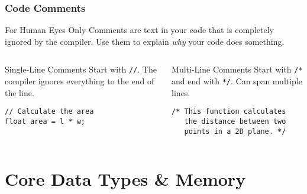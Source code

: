 \documentclass{beamer}
\begin{document}
\begin{frame}[fragile]
\frametitle{Code Comments}
\begin{block}{For Human Eyes Only}
Comments are text in your code that is completely ignored by the compiler. Use them to explain \textit{why} your code does something.
\end{block}
\pause

\begin{columns}[T]
\begin{column}{0.5\textwidth}
\begin{alertblock}{Single-Line Comments}
Start with \texttt{//}. The compiler ignores everything to the end of the line.
\begin{verbatim}
// Calculate the area
float area = l * w;
\end{verbatim}
\end{alertblock}
\end{column}
\begin{column}{0.5\textwidth}
\begin{exampleblock}{Multi-Line Comments}
Start with \texttt{/*} and end with \texttt{*/}. Can span multiple lines.
\begin{verbatim}
/* This function calculates
   the distance between two
   points in a 2D plane. */
\end{verbatim}
\end{exampleblock}
\end{column}
\end{columns}
\end{frame}

\section{Core Data Types \& Memory}
\end{document}

